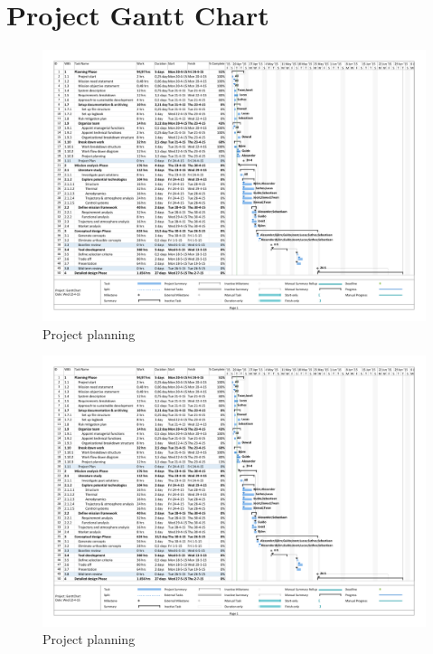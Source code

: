\section{Project Gantt Chart}

\begin{figure}
    \includegraphics[scale=0.9]{Figure/GanttChart.pdf}
    \caption{Project planning}
    \label{fig:GanttChart}
\end{figure}

\begin{figure}
    \includegraphics[scale=0.9]{Figure/GanttChart.pdf}
    \caption{Project planning}
\end{figure}

